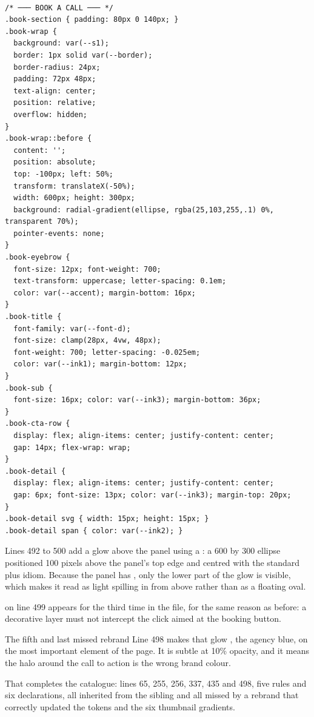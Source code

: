 \begin{lstlisting}[firstnumber=480,caption={\file{css/site.css}, lines 480--524}]

/* ─── BOOK A CALL ─── */
.book-section { padding: 80px 0 140px; }
.book-wrap {
  background: var(--s1);
  border: 1px solid var(--border);
  border-radius: 24px;
  padding: 72px 48px;
  text-align: center;
  position: relative;
  overflow: hidden;
}
.book-wrap::before {
  content: '';
  position: absolute;
  top: -100px; left: 50%;
  transform: translateX(-50%);
  width: 600px; height: 300px;
  background: radial-gradient(ellipse, rgba(25,103,255,.1) 0%, transparent 70%);
  pointer-events: none;
}
.book-eyebrow {
  font-size: 12px; font-weight: 700;
  text-transform: uppercase; letter-spacing: 0.1em;
  color: var(--accent); margin-bottom: 16px;
}
.book-title {
  font-family: var(--font-d);
  font-size: clamp(28px, 4vw, 48px);
  font-weight: 700; letter-spacing: -0.025em;
  color: var(--ink1); margin-bottom: 12px;
}
.book-sub {
  font-size: 16px; color: var(--ink3); margin-bottom: 36px;
}
.book-cta-row {
  display: flex; align-items: center; justify-content: center;
  gap: 14px; flex-wrap: wrap;
}
.book-detail {
  display: flex; align-items: center; justify-content: center;
  gap: 6px; font-size: 13px; color: var(--ink3); margin-top: 20px;
}
.book-detail svg { width: 15px; height: 15px; }
.book-detail span { color: var(--ink2); }
\end{lstlisting}

Lines 492 to 500 add a glow above the panel using a : a 600 by 300
ellipse positioned 100 pixels above the panel's top edge and centred with the
standard  plus  idiom. Because the panel has
, only the lower part of the glow is visible, which makes it
read as light spilling in from above rather than as a floating oval.

 on line 499 appears for the third time in the file, for
the same reason as before: a decorative layer must not intercept the click aimed at
the booking button.

\begin{honest}{The fifth and last missed rebrand}
Line 498 makes that glow , the agency blue, on the most
important element of the page. It is subtle at 10\% opacity, and it means the halo
around the call to action is the wrong brand colour.

That completes the catalogue: lines 65, 255, 256, 337, 435 and 498, five rules and
six declarations, all inherited from the sibling and all missed by a rebrand that
correctly updated the tokens and the six thumbnail gradients.
\end{honest}

